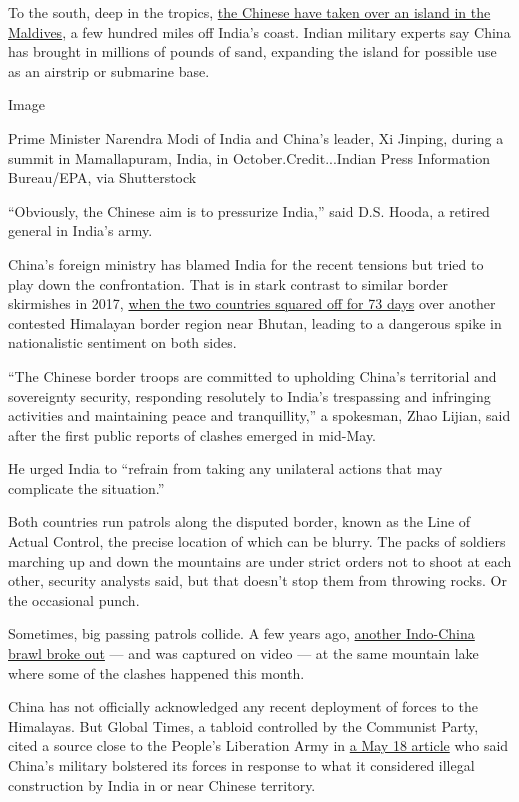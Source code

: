 To the south, deep in the tropics,
\href{https://www.defencenews.in/article/India-Worries-China-may-be-Constructing-South-China-Sea-Like-Artificial-Island-in-Maldives-830589}{the
Chinese have taken over an island in the Maldives}, a few hundred miles
off India's coast. Indian military experts say China has brought in
millions of pounds of sand, expanding the island for possible use as an
airstrip or submarine base.

Image

Prime Minister Narendra Modi of India and China's leader, Xi Jinping,
during a summit in Mamallapuram, India, in October.Credit...Indian Press
Information Bureau/EPA, via Shutterstock

``Obviously, the Chinese aim is to pressurize India,'' said D.S. Hooda,
a retired general in India's army.

China's foreign ministry has blamed India for the recent tensions but
tried to play down the confrontation. That is in stark contrast to
similar border skirmishes in 2017,
\href{https://www.nytimes.com/2017/07/26/world/asia/dolam-plateau-china-india-bhutan.html}{when
the two countries squared off for 73 days} over another contested
Himalayan border region near Bhutan, leading to a dangerous spike in
nationalistic sentiment on both sides.

``The Chinese border troops are committed to upholding China's
territorial and sovereignty security, responding resolutely to India's
trespassing and infringing activities and maintaining peace and
tranquillity,'' a spokesman, Zhao Lijian, said after the first public
reports of clashes emerged in mid-May.

He urged India to ``refrain from taking any unilateral actions that may
complicate the situation.''

Both countries run patrols along the disputed border, known as the Line
of Actual Control, the precise location of which can be blurry. The
packs of soldiers marching up and down the mountains are under strict
orders not to shoot at each other, security analysts said, but that
doesn't stop them from throwing rocks. Or the occasional punch.

Sometimes, big passing patrols collide. A few years ago,
\href{https://theprint.in/report/visuals-show-india-china-clash-at-ladakh-was-serious-troops-injured/7015/}{another
Indo-China brawl broke out} --- and was captured on video --- at the
same mountain lake where some of the clashes happened this month.

China has not officially acknowledged any recent deployment of forces to
the Himalayas. But Global Times, a tabloid controlled by the Communist
Party, cited a source close to the People's Liberation Army in
\href{http://www.globaltimes.cn/content/1188681.shtml}{a May 18 article}
who said China's military bolstered its forces in response to what it
considered illegal construction by India in or near Chinese territory.

